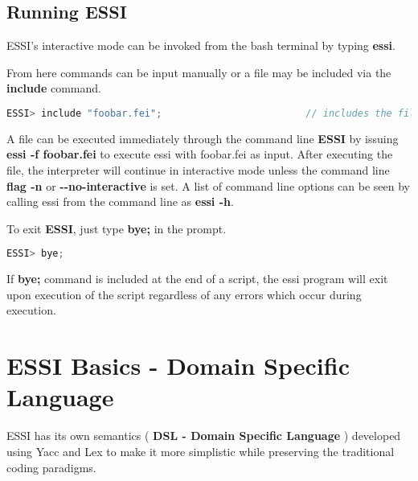 \documentclass{article}
\begin{document}


\subsection {Running ESSI}
ESSI's interactive mode can be invoked from the bash terminal by typing \textbf{essi}. 



\noindent From here commands can be input manually or a file may be included via the \textbf{include} command.

\begin{lstlisting}[language=C,backgroundcolor=\color{grayish}]
ESSI> include "foobar.fei";                         // includes the file foobar.fei
\end{lstlisting}

\noindent A file can be executed immediately through the command line \textbf{ESSI} by issuing \textbf{essi -f foobar.fei} to execute essi with foobar.fei as input. After executing the file, the interpreter will continue in interactive mode unless the command line \textbf{flag -n} or \textbf{ \textbf{-}-no-interactive} is set. A list of command line options can be seen by calling essi from the command line as \textbf{essi -h}.



\noindent To exit \textbf{ESSI}, just type \textbf{bye;} in the prompt. 

\begin{lstlisting}[language=C,backgroundcolor=\color{grayish}]
ESSI> bye;                        
\end{lstlisting}

\noindent  If \textbf{bye;} command is included at the end of a script, the essi program will exit upon execution of the script regardless of any errors which occur during execution.


\section {ESSI Basics - Domain Specific Language}
ESSI has its own semantics ( \textbf{DSL - Domain Specific Language} ) developed using Yacc and Lex to make it more simplistic while preserving the traditional coding paradigms.
   
\end{document}
